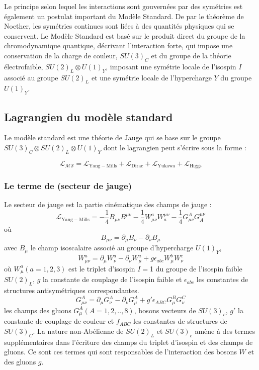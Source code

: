 Le principe selon lequel les interactions sont gouvernées par des symétries est également un postulat important du Modèle Standard. De par le théorème de Noether, les symétries continues sont liées à des quantités physiques qui se conservent. Le Modèle Standard est basé sur le produit direct du groupe de la chromodynamique quantique, décrivant l'interaction forte, qui impose une conservation de la charge de couleur, $SU(3)_{C}$ et du groupe de la théorie électrofaible, $SU(2)_{L} \otimes U(1)_{Y}$, imposant une symétrie locale de l'isospin $I$ associé au groupe $SU(2)_{L}$ et une symétrie locale de l'hypercharge $Y$ du groupe $U(1)_{Y}$.

\subsection{Lagrangien du modèle standard}
Le modèle standard est une théorie de Jauge qui se base sur le groupe $SU(3)_{C} \otimes SU(2)_{L} \otimes U(1)_{Y}$ dont le lagrangien peut s'écrire sous la forme :

\begin{equation}
\mathcal{L_{MS}}=\mathcal{L}_{\mathrm{Yang-Mills}}+\mathcal{L}_{\mathrm{Dirac}}+\mathcal{L}_{\mathrm{Yukawa}}+\mathcal{L}_{\mathrm{Higgs}}
\end{equation}

\subsubsection{Le terme de  (secteur de jauge)}
Le secteur de jauge est la partie cinématique des champs de jauge :
\begin{equation}
\mathcal{L}_{\mathrm{Yang-Mills}}=-\frac{1}{4}B_{\mu\nu}B^{\mu\nu}-\frac{1}{4}W_{\mu\nu}^{a}W_{a}^{\mu\nu}-\frac{1}{4}G_{\mu\nu}^{A}G_{A}^{\mu\nu}
\end{equation}
où 
\begin{equation}
B_{\mu\nu}=\partial_{\mu}B_{\nu}-\partial_{\nu}B_{\mu}
\end{equation}
avec $B_{\mu}$ le champ isoscalaire associé au groupe d'hypercharge $U(1)_{Y}$,
\begin{equation}
W_{\mu\nu}^{a}=\partial_{\mu}W_{\nu}^{a}-\partial_{\nu}W_{\mu}^{a}+g\epsilon_{abc}W_{\mu}^{b}W_{\nu}^{c}
\end{equation}
où $W_{\mu}^{a} (a=1,2,3)$ est le triplet d'isospin $I=$\num{1} du groupe de l'isospin faible $SU(2)_{L}$, $g$ la constante de couplage de l'isospin faible et $\epsilon_{abc}$ les constantes de structures antisymétriques correspondantes.  
\begin{equation}
G_{\mu\nu}^{A}=\partial_{\mu}G_{\nu}^{A}-\partial_{\nu}G_{\mu}^{A}+g'\epsilon_{ABC}G_{\mu}^{B}G_{\nu}^{C}
\end{equation}
les champs des gluons $G_{\mu}^{A} (A=1,2,..,8)$, bosons vecteurs de $SU(3)_{c}$, $g'$ la constante de couplage de couleur et $f_{ABC}$ les constantes de structures de $SU(3)_{C}$.
La nature non-Abélienne de $SU(2)_{L}$ et $SU(3)_{c}$ amène à des termes supplémentaires dans l'écriture des champs du triplet d'isospin et des champs de gluons. Ce sont ces termes qui sont responsables de l'interaction des bosons $W$ et des gluons $g$.


